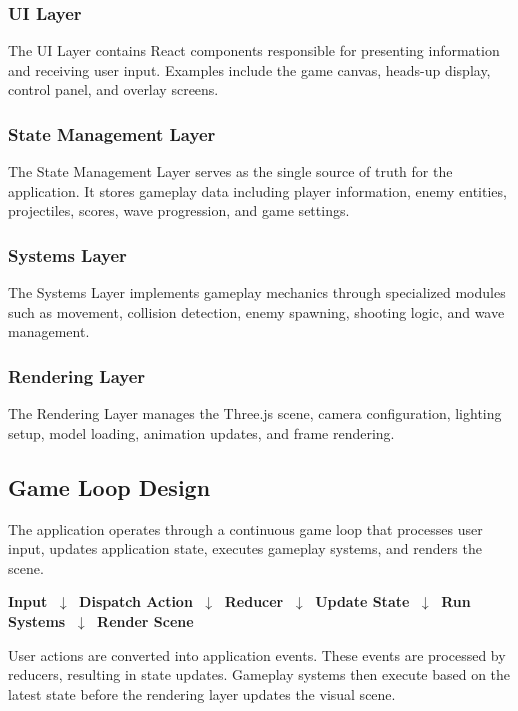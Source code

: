 \documentclass[11pt,a4paper]{article}
\begin{document}
\subsubsection{UI Layer}
The UI Layer contains React components responsible for presenting information and
receiving user input. Examples include the game canvas, heads-up display,
control panel, and overlay screens.

\subsubsection{State Management Layer}
The State Management Layer serves as the single source of truth for the
application. It stores gameplay data including player information, enemy
entities, projectiles, scores, wave progression, and game settings.

\subsubsection{Systems Layer}
The Systems Layer implements gameplay mechanics through specialized modules such
as movement, collision detection, enemy spawning, shooting logic, and wave
management.

\subsubsection{Rendering Layer}
The Rendering Layer manages the Three.js scene, camera configuration, lighting
setup, model loading, animation updates, and frame rendering.

\subsection{Game Loop Design}

The application operates through a continuous game loop that processes user
input, updates application state, executes gameplay systems, and renders the
scene.

\begin{center}
\textbf{Input} $\;\downarrow\;$
\textbf{Dispatch Action} $\;\downarrow\;$
\textbf{Reducer} $\;\downarrow\;$
\textbf{Update State} $\;\downarrow\;$
\textbf{Run Systems} $\;\downarrow\;$
\textbf{Render Scene}
\end{center}

User actions are converted into application events. These events are processed by
reducers, resulting in state updates. Gameplay systems then execute based on the
latest state before the rendering layer updates the visual scene.
\end{document}
